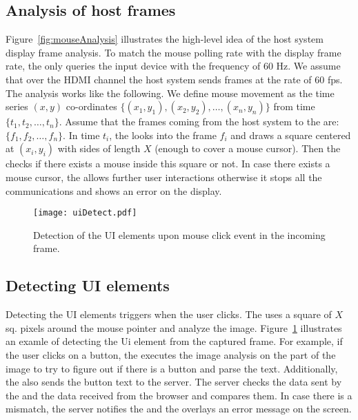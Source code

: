 \subsection{Analysis of host frames}
\label{sec:systemnDesign:analysis}

Figure~\ref{fig:mouseAnalysis} illustrates the high-level idea of the host system display frame analysis. To match the mouse polling rate with the display frame rate, the \device only queries the input device with the frequency of $60$ Hz. We assume that over the HDMI channel the host system sends frames at the rate of $60$ fps. The analysis works like the following. We define mouse movement as the time series $(x,y)$ co-ordinates $\{(x_1,y_1), (x_2, y_2), \ldots, (x_n,y_n)\}$ from time $\{t_1, t_2, \ldots, t_n\}$. Assume that the frames coming from the host system to the \device are: $\{f_1, f_2, \ldots, f_n\}$. In time $t_i$, the \device looks into the frame $f_i$ and draws a square centered at $(x_i, y_i)$ with sides of length $X$ (enough to cover a mouse cursor). Then the \device checks if there exists a mouse inside this square or not. In case there exists a mouse cursor, the \device allows further user interactions otherwise it stops all the communications and shows an error on the display.

\begin{figure}
\centering
\texttt{[image: uiDetect.pdf]}
\caption{Detection of the UI elements upon mouse click event in the incoming frame.}
\label{fig:uiDetect}
\centering
\end{figure}


\subsection{Detecting UI elements}
\label{sec:systemnDesign:uiElements}

Detecting the UI elements triggers when the user clicks. The \device uses a square of $X$ sq. pixels around the mouse pointer and analyze the image. Figure~\ref{fig:uiDetect} illustrates an examle of detecting the Ui element from the captured frame. For example, if the user clicks on a button, the \device executes the image analysis on the part of the image to try to figure out if there is a button and parse the text. Additionally, the \device also sends the button text to the server. The server checks the data sent by the \device and the data received from the browser and compares them. In case there is a mismatch, the server notifies the \device and the \device overlays an error message on the screen. 


